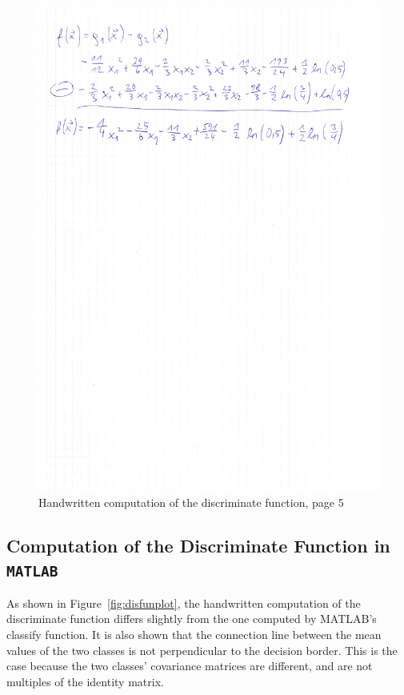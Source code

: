 \documentclass[subfigure,epsfig,fleqn,amssmb,float,caption,ausarbeitung]{scrartcl}
\begin{document}
\begin{figure}
\includegraphics[width=14cm]{img/discriminantFunction5.jpg}
	\caption{Handwritten computation of the discriminate function, page 5}
	\label{fig:hws5}
\end{figure}

\subsection{Computation of the Discriminate Function in \texttt{MATLAB}}
\label{sec:Matlab}

As shown in  Figure~\ref{fig:disfunplot}, the handwritten computation of the discriminate function differs slightly from the one computed by MATLAB's classify function. It is also shown that the connection line between the mean values of the two classes is not perpendicular to the decision border. This is the case because the two classes' covariance matrices are different, and are not multiples of the identity matrix.
\end{document}
